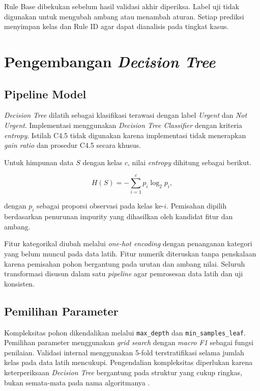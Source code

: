 
Rule Base dibekukan sebelum hasil validasi akhir diperiksa. Label uji tidak digunakan untuk mengubah ambang atau menambah aturan. Setiap prediksi menyimpan kelas dan Rule ID agar dapat dianalisis pada tingkat kasus.

\FloatBarrier

\section{Pengembangan \textit{Decision Tree}}

\subsection{Pipeline Model}

\textit{Decision Tree} dilatih sebagai klasifikasi terawasi dengan label \textit{Urgent} dan \textit{Not Urgent}. Implementasi menggunakan \textit{Decision Tree Classifier} dengan kriteria \textit{entropy}. Istilah C4.5 tidak digunakan karena implementasi tidak menerapkan \textit{gain ratio} dan prosedur C4.5 secara khusus.

Untuk himpunan data $S$ dengan kelas $c$, nilai \textit{entropy} dihitung sebagai berikut.

\begin{equation}
H(S)=-\sum_{i=1}^{c} p_i\log_2 p_i,
\label{eq:entropy-dt}
\end{equation}

dengan $p_i$ sebagai proporsi observasi pada kelas ke-$i$. Pemisahan dipilih berdasarkan penurunan impurity yang dihasilkan oleh kandidat fitur dan ambang.

Fitur kategorikal diubah melalui \textit{one-hot encoding} dengan penanganan kategori yang belum muncul pada data latih. Fitur numerik diteruskan tanpa penskalaan karena pemisahan pohon bergantung pada urutan dan ambang nilai. Seluruh transformasi disusun dalam satu \textit{pipeline} agar pemrosesan data latih dan uji konsisten.

\subsection{Pemilihan Parameter}

Kompleksitas pohon dikendalikan melalui \texttt{max\_depth} dan \texttt{min\_samples\_leaf}. Pemilihan parameter menggunakan \textit{grid search} dengan \textit{macro F1} sebagai fungsi penilaian. Validasi internal menggunakan 5-fold terstratifikasi selama jumlah kelas pada data latih mencukupi. Pengendalian kompleksitas diperlukan karena keterperiksaan \textit{Decision Tree} bergantung pada struktur yang cukup ringkas, bukan semata-mata pada nama algoritmanya \cite{RudinEtAl2022}.

